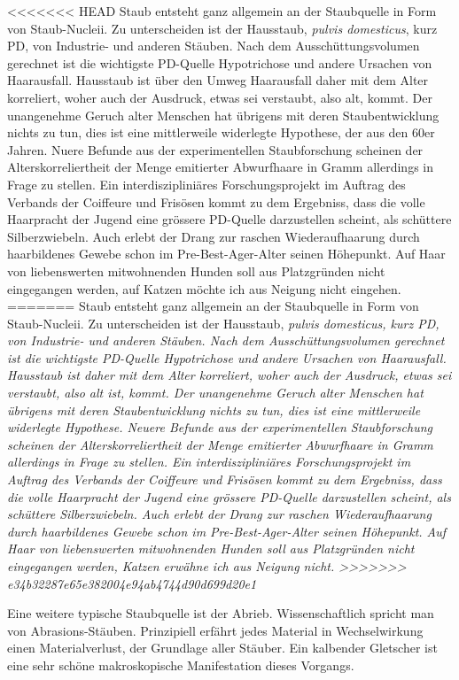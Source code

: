 <<<<<<< HEAD
Staub entsteht ganz allgemein an der Staubquelle in Form von  Staub-Nucleii. Zu unterscheiden ist der Hausstaub, \textit{pulvis domesticus}, kurz PD, von Industrie- und anderen Stäuben. Nach dem Ausschüttungsvolumen gerechnet ist die wichtigste PD-Quelle Hypotrichose und andere Ursachen von Haarausfall. Hausstaub ist über den Umweg Haarausfall daher mit dem Alter korreliert, woher auch der Ausdruck, etwas sei verstaubt, also alt, kommt. Der unangenehme Geruch alter Menschen hat übrigens mit deren Staubentwicklung nichts zu tun, dies ist eine mittlerweile widerlegte Hypothese, der aus den 60er Jahren. Nuere Befunde aus der experimentellen Staubforschung scheinen der Alterskorreliertheit der Menge emitierter Abwurfhaare in Gramm allerdings in Frage zu stellen. Ein interdiszipliniäres Forschungsprojekt im Auftrag des Verbands der Coiffeure und Frisösen kommt zu dem Ergebniss, dass die volle Haarpracht der Jugend eine grössere PD-Quelle darzustellen scheint, als schüttere Silberzwiebeln. Auch erlebt der Drang zur raschen Wiederaufhaarung durch haarbildenes Gewebe schon im Pre-Best-Ager-Alter seinen Höhepunkt. Auf Haar von liebenswerten mitwohnenden Hunden soll aus Platzgründen nicht eingegangen werden, auf Katzen möchte ich aus Neigung nicht eingehen.
=======
Staub entsteht ganz allgemein an der Staubquelle in Form von  Staub-Nucleii. Zu unterscheiden ist der Hausstaub, \itshape{pulvis domesticus}, kurz PD, von Industrie- und anderen Stäuben. Nach dem Ausschüttungsvolumen gerechnet ist die wichtigste PD-Quelle Hypotrichose und andere Ursachen von Haarausfall. Hausstaub ist daher mit dem Alter korreliert, woher auch der Ausdruck, etwas sei verstaubt, also alt ist, kommt. Der unangenehme Geruch alter Menschen hat übrigens mit deren Staubentwicklung nichts zu tun, dies ist eine mittlerweile widerlegte Hypothese. Neuere Befunde aus der experimentellen Staubforschung scheinen der Alterskorreliertheit der Menge emitierter Abwurfhaare in Gramm allerdings in Frage zu stellen. Ein interdiszipliniäres Forschungsprojekt im Auftrag des Verbands der Coiffeure und Frisösen kommt zu dem Ergebniss, dass die volle Haarpracht der Jugend eine grössere PD-Quelle darzustellen scheint, als schüttere Silberzwiebeln. Auch erlebt der Drang zur raschen Wiederaufhaarung durch haarbildenes Gewebe schon im Pre-Best-Ager-Alter seinen Höhepunkt. Auf Haar von liebenswerten mitwohnenden Hunden soll aus Platzgründen nicht eingegangen werden, Katzen erwähne ich aus Neigung nicht.
>>>>>>> e34b32287e65e382004e94ab4744d90d699d20e1

Eine weitere typische Staubquelle ist der Abrieb. Wissenschaftlich spricht man von Abrasions-Stäuben. Prinzipiell erfährt jedes Material in Wechselwirkung einen Materialverlust, der Grundlage aller Stäuber. Ein kalbender Gletscher ist eine sehr schöne makroskopische Manifestation dieses Vorgangs.

